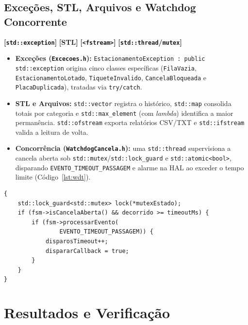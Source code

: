 \documentclass[10pt,twocolumn,a4paper]{article}
\newcommand{\code}[1]{\texttt{\footnotesize #1}}
\newcommand{\conceptbadge}[1]{\textbf{\color{ufscBlue}[#1]}}
\begin{document}
\subsection{Exceções, STL, Arquivos e Watchdog Concorrente}

\conceptbadge{\code{std::exception}} \conceptbadge{STL} \conceptbadge{\code{<fstream>}} \conceptbadge{\code{std::thread}/\code{mutex}}

\begin{itemize}[leftmargin=1.2em, itemsep=2pt]
    \item \textbf{Exceções (\code{Excecoes.h}):} \code{EstacionamentoException : public std::exception} origina cinco classes específicas (\code{FilaVazia}, \code{EstacionamentoLotado}, \code{TiqueteInvalido}, \code{CancelaBloqueada} e \code{PlacaDuplicada}), tratadas via \code{try/catch}.
    \item \textbf{STL e Arquivos:} \code{std::vector} registra o histórico, \code{std::map} consolida totais por categoria e \code{std::max\_element} (com \textit{lambda}) identifica a maior permanência. \code{std::ofstream} exporta relatórios CSV/TXT e \code{std::ifstream} valida a leitura de volta.
    \item \textbf{Concorrência (\code{WatchdogCancela.h}):} uma \code{std::thread} supervisiona a cancela aberta sob \code{std::mutex}/\code{std::lock\_guard} e \code{std::atomic<bool>}, disparando \code{EVENTO\_TIMEOUT\_PASSAGEM} e alarme na HAL ao exceder o tempo limite (Código~\ref{lst:wdt}).
\end{itemize}

\begin{lstlisting}[label={lst:wdt}, caption={Supervisão concorrente segura em \code{WatchdogCancela.h}.}]
{
    std::lock_guard<std::mutex> lock(*mutexEstado);
    if (fsm->isCancelaAberta() && decorrido >= timeoutMs) {
        if (fsm->processarEvento(
                EVENTO_TIMEOUT_PASSAGEM)) {
            disparosTimeout++;
            dispararCallback = true;
        }
    }
}
\end{lstlisting}

\section{Resultados e Verificação}
\end{document}
